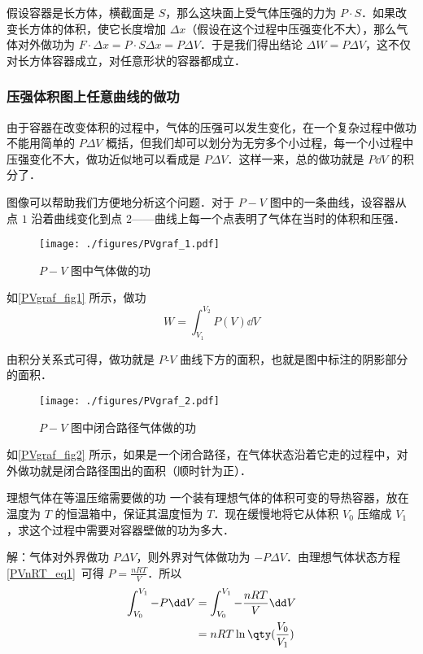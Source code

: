 假设容器是长方体，横截面是 $S$，那么这块面上受气体压强的力为 $P\cdot S$．如果改变长方体的体积，使它长度增加 $\Delta x$（假设在这个过程中压强变化不大），那么气体对外做功为 $F\cdot \Delta x=P\cdot S\Delta x=P\Delta V$．于是我们得出结论 $\Delta W=P\Delta V$，这不仅对长方体容器成立，对任意形状的容器都成立．
\subsubsection{压强体积图上任意曲线的做功}
由于容器在改变体积的过程中，气体的压强可以发生变化，在一个复杂过程中做功不能用简单的 $P\Delta V$ 概括，但我们却可以划分为无穷多个小过程，每一个小过程中压强变化不大，做功近似地可以看成是 $P\Delta V$．这样一来，总的做功就是 $P\dd V$ 的积分了．

图像可以帮助我们方便地分析这个问题．对于 $P-V$ 图中的一条曲线，设容器从点 $1$ 沿着曲线变化到点 $2$——曲线上每一个点表明了气体在当时的体积和压强．
\begin{figure}[ht]
\centering
\texttt{[image: ./figures/PVgraf\_1.pdf]}
\caption{$P-V$ 图中气体做的功} \label{PVgraf_fig1}
\end{figure}

如\autoref{PVgraf_fig1} 所示，做功
\begin{equation}\label{PVgraf_eq1}
W = \int_{V_1}^{V_2}P(V) \dd{V}
\end{equation}

由积分关系式可得，做功就是 $P$-$V$ 曲线下方的面积，也就是图中标注的阴影部分的面积． 

\begin{figure}[ht]  
\centering
\texttt{[image: ./figures/PVgraf\_2.pdf]}
\caption{$P-V$ 图中闭合路径气体做的功} \label{PVgraf_fig2}
\end{figure}

如\autoref{PVgraf_fig2} 所示，如果是一个闭合路径，在气体状态沿着它走的过程中，对外做功就是闭合路径围出的面积（顺时针为正）．

\begin{example}{理想气体在等温压缩需要做的功}
一个装有理想气体的体积可变的导热容器，放在温度为 $T$ 的恒温箱中，保证其温度恒为 $T$．现在缓慢地将它从体积 $V_0$ 压缩成 $V_1$，求这个过程中需要对容器壁做的功为多大．

解：气体对外界做功 $P\Delta V$，则外界对气体做功为 $-P\Delta V$．由理想气体状态方程\autoref{PVnRT_eq1}~可得 $P=\frac{nRT}{V}$．所以
\begin{equation}
\begin{aligned}
\int_{V_0}^{V_1} -P\dd V&=\int_{V_0}^{V_1} -\frac{nRT}{V} \dd V \\
&=nRT \ln\qty(\frac{V_0}{V_1})
\end{aligned}
\end{equation}
\end{example}
